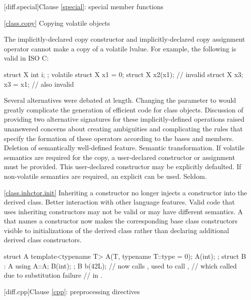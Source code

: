 [diff.special]{Clause \ref{special}: special member functions}

\ref{class.copy}
\change Copying volatile objects

The implicitly-declared copy constructor and
implicitly-declared copy assignment operator
cannot make a copy of a volatile lvalue.
For example, the following is valid in ISO C:

\begin{codeblock}
struct X { int i; };
volatile struct X x1 = {0};
struct X x2(x1);                // invalid \Cpp
struct X x3;
x3 = x1;                        // also invalid \Cpp
\end{codeblock}

\rationale
Several alternatives were debated at length.
Changing the parameter to
would greatly complicate the generation of
efficient code for class objects.
Discussion of
providing two alternative signatures for these
implicitly-defined operations raised
unanswered concerns about creating
ambiguities and complicating
the rules that specify the formation of
these operators according to the bases and
members.
\effect
Deletion of semantically well-defined feature.
\difficulty
Semantic transformation.
If volatile semantics are required for the copy,
a user-declared constructor or assignment must
be provided. \enternote This user-declared
constructor may be explicitly defaulted. \exitnote
If non-volatile semantics are required,
an explicit
can be used.
\howwide
Seldom.

\ref{class.inhctor.init}
\change
Inheriting a constructor no longer injects a constructor into the derived class.
\rationale
Better interaction with other language features.
\effect
Valid \CppXIV code that uses inheriting constructors may not be valid
or may have different semantics. A 
that names a constructor now makes the corresponding base class constructors
visible to initializations of the derived class
rather than declaring additional derived class constructors.
\begin{codeblock}
struct A {
  template<typename T> A(T, typename T::type = 0);
  A(int);
};
struct B : A {
  using A::A;
  B(int);
};
B b(42L); // now calls , used to call ,
          // which called  due to substitution failure
          // in .
\end{codeblock}

[diff.cpp]{Clause \ref{cpp}: preprocessing directives}

